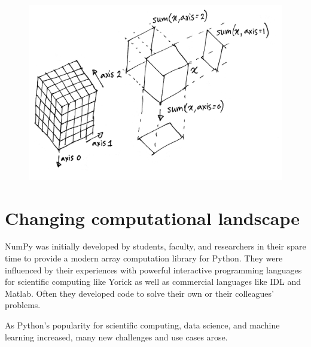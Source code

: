\begin{figure}
  \centering
  \includegraphics[width=\linewidth]{static/sketches/reductions}
  \caption{
   }
  \label{fig:reductions}
\end{figure}

\section*{Changing computational landscape}



NumPy was initially developed by students, faculty, and researchers in their
spare time to provide a modern array computation library for Python.
They were influenced by their experiences with powerful interactive programming
languages for scientific computing like Yorick \cite{munro1995using} as well
as commercial languages like IDL and Matlab.
Often they developed code to solve their own or their colleagues' problems.

As Python's popularity for scientific computing, data science, and machine
learning increased, many new challenges and use cases arose.

